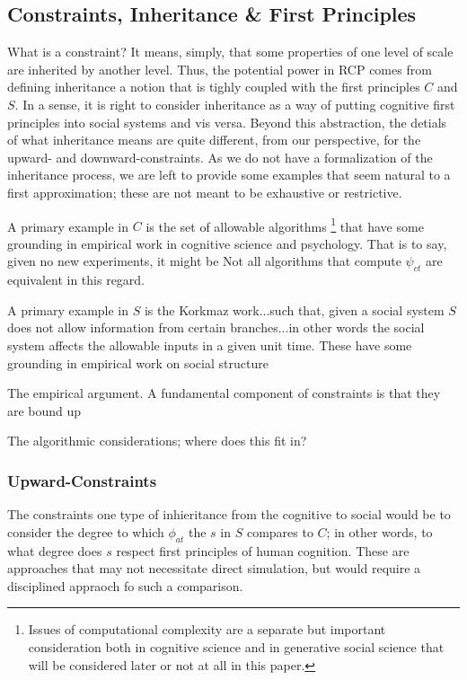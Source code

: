 \documentclass{article}
\begin{document}
\subsection{Constraints, Inheritance \& First Principles}
What is a constraint?  It means, simply, that some properties of one level of scale are inherited by another level.  Thus, the potential power in RCP comes from defining inheritance a notion that is tighly coupled with the first principles $C$ and $S$. In a sense, it is right to consider inheritance as a way of putting cognitive first principles into social systems and vis versa. Beyond this abstraction, the detials of what inheritance means are quite different, from our perspective, for the upward- and downward-constraints.  As we do not have a formalization of the inheritance process, we are left to provide some examples that seem natural to a first approximation; these are not meant to be exhaustive or restrictive.

A primary example in $C$ is the set of allowable algorithms \footnote{Issues of computational complexity are a separate but important consideration both in cognitive science and in generative social science that will be considered later or not at all in this paper.} that have some grounding in empirical work in cognitive science and psychology.  That is to say, given no new experiments, it might be   Not all algorithms that compute $\psi_{ct}$ are equivalent in this regard.  

A primary example in $S$ is the Korkmaz work...such that, given a social system $S$ does not allow information from certain branches...in other words the social system affects the allowable inputs in a given unit time.  These have some grounding in empirical work on social structure
 
The empirical argument.  A fundamental component of constraints is that they are bound up

The algorithmic considerations; where does this fit in?

\subsubsection{Upward-Constraints}
The constraints one type of inhieritance from the cognitive to social would be to consider the degree to which $\phi_{at}$ the $s$ in $S$ compares to $C$; in other words, to what degree does $s$ respect first principles of human cognition.  These are approaches that may not necessitate direct simulation, but would require a disciplined appraoch fo such a comparison. 
\end{document}
